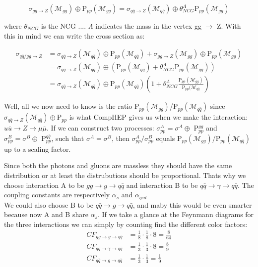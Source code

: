 \begin{equation}
\sigma_{gg\rightarrow Z} (\mathcal{M}_{gg}) \oplus \textrm{P}_{pp}(\mathcal{M}_{gg})=\sigma_{q \bar q\rightarrow Z}(\mathcal{M}_{q \bar q}) \oplus \theta_{NCG}^{\Lambda}\textrm{P}_{pp}(\mathcal{M}_{gg})
\end{equation}

where $\theta_{NCG}$ is the NCG .... $\Lambda$ indicates the mass in the vertex gg $\rightarrow$ Z. With this in mind we can write the cross section as:

\begin{align}
\sigma_{q \bar q/gg \rightarrow Z} &= \sigma_{q \bar q \rightarrow Z} (\mathcal{M}_{q \bar q}) \oplus \textrm{P}_{pp}(\mathcal{M}_{q \bar q})+ \sigma_{gg\rightarrow Z} (\mathcal{M}_{gg}) \oplus \textrm{P}_{pp}(\mathcal{M}_{gg})\nonumber \\ 
&= \sigma_{q \bar q\rightarrow Z}(\mathcal{M}_{q \bar q}) \oplus (\textrm{P}_{pp}(\mathcal{M}_{q \bar q})+\theta_{NCG}^{\Lambda}\textrm{P}_{pp}(\mathcal{M}_{gg}))\nonumber \\ 
&= \sigma_{q \bar q\rightarrow Z}(\mathcal{M}_{q \bar q}) \oplus \textrm{P}_{pp}(\mathcal{M}_{q \bar q})(1+\theta_{NCG}^{\Lambda}\frac{\textrm{P}_{pp}(\mathcal{M}_{gg})}{\textrm{P}_{pp}(\mathcal{M}_{q \bar q}})
\end{align}

Well, all we now need to know is the ratio P$_{pp}(\mathcal{M}_{gg})$/P$_{pp}(\mathcal{M}_{q \bar q})$ since $ \sigma_{q \bar q\rightarrow Z}(\mathcal{M}_{q \bar q}) \oplus \textrm{P}_{pp}$ is what CompHEP gives us when we make the interaction: $u \bar u \rightarrow Z \rightarrow \mu \bar \mu $. If we can construct two processes: $\sigma_{pp}^{A}=\sigma^{A} \oplus$ P$_{pp}^{gg}$ and $\sigma_{pp}^{B}=\sigma^{B} \oplus$ P$_{pp}^{q \bar q}$, such that $\sigma^{A}=\sigma^{B}$, then $\sigma_{pp}^{A}/\sigma_{pp}^{B}$ equals  P$_{pp}(\mathcal{M}_{gg})$/P$_{pp}(\mathcal{M}_{q \bar q})$ up to a scaling factor.

Since both the photons and gluons are massless they should have the same distribution or at least the distrubutions should be proportional. Thats why we choose interaction A to be $gg \rightarrow g \rightarrow q \bar q$ and interaction B to be $q \bar q \rightarrow \gamma \rightarrow q \bar q$. The coupling constants are respectively $\alpha_{s}$ and $\alpha_{qed}$\\


We could also choose B to be  $q \bar q \rightarrow g \rightarrow q \bar q$, and maby this would be even smarter because now A and B share $\alpha_{s}$. If we take a glance at the Feynmann diagrams for the three interactions we can simply by counting find the different color factors:
\begin{align}
	CF_{gg \rightarrow g \rightarrow q \bar q}&=\frac{1}{8} \cdot \frac{1}{8} \cdot 8=\frac{8}{64}\\
	CF_{q \bar q \rightarrow \gamma \rightarrow q \bar q}&=\frac{1}{3} \cdot \frac{1}{3} \cdot 8=\frac{8}{9}\\
	CF_{q \bar q \rightarrow g \rightarrow q \bar q}&=\frac{1}{3} \cdot \frac{1}{3}=\frac{1}{9}
\end{align}

